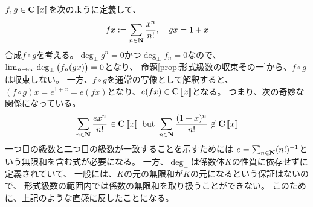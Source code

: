 {	\begin{example}[収束しない形式級数]\label{eg:収束しない形式級数} %
		$f,g\in\mathbf{C}\mathinner{[\![{x}]\!]}$を次のように定義して、
		\begin{equation*}\begin{split}
			fx := \sum_{n\in\mathbf{N}}\frac{x^n}{n!}
			,\quad gx = 1 + x
		\end{split}\end{equation*}
		合成$f\circ g$を考える。$\deg_\bot g^n=0$かつ$\deg_\bot f_n=0$なので、
		$\lim_{n\to\infty}\deg_\bot\mathinner{\bigl({f_n(gx)}\bigr)}=0$となり、
		命題\ref{prop:形式級数の収束その一}から、$f\circ g$は収束しない。
		一方、$f\circ g$を通常の写像として解釈すると、
		$(f\circ g)x=e^{1+x}=e(fx)$となり、$e(fx)\in\mathbf{C}\mathinner{[\![{x}]\!]}$となる。
		つまり、次の奇妙な関係になっている。
		\begin{equation*}\begin{split}
			\sum_{n\in\mathbf{N}}\frac{ex^n}{n!}\in\mathbf{C}\mathinner{[\![{x}]\!]}
			\text{ but }
			\sum_{n\in\mathbf{N}}\frac{(1 + x)^n}{n!}\not\in\mathbf{C}\mathinner{[\![{x}]\!]}
		\end{split}\end{equation*}
		一つ目の級数と二つ目の級数が一致することを示すためには
		$e=\sum_{n\in\mathbf{N}}(n!)^{-1}$という無限和を含む式が必要になる。
		一方、$\deg_\bot$は係数体$K$の性質に依存せずに定義されていて、
		一般には、$K$の元の無限和が$K$の元になるという保証はないので、
		形式級数の範囲内では係数の無限和を取り扱うことができない。
		このために、上記のような直感に反したことになる。\EOP
	\end{example} %
%
}\endgroup %
